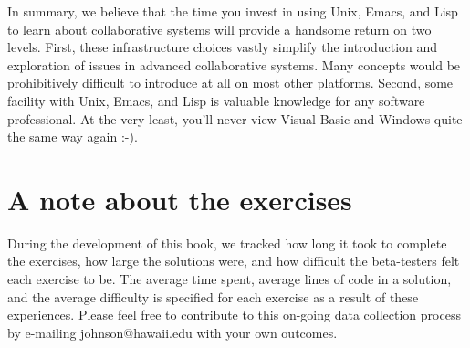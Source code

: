 In summary, we believe that the time you invest in using Unix, Emacs, and
Lisp to learn about collaborative systems will provide a handsome return on
two levels.  First, these infrastructure choices vastly simplify the
introduction and exploration of issues in advanced collaborative systems.
Many concepts would be prohibitively difficult to introduce at all on most
other platforms. Second, some facility with Unix, Emacs, and Lisp is
valuable knowledge for any software professional.  At the very least,
you'll never view Visual Basic and Windows quite the same way again :-).
 
\section{A note about the exercises}

During the development of this book, we tracked how long it took to
complete the exercises, how large the solutions were, and how difficult the
beta-testers felt each exercise to be.  The average time spent, average
lines of code in a solution, and the average difficulty is specified for
each exercise as a result of these experiences.  Please feel free to
contribute to this on-going data collection process by e-mailing
johnson@hawaii.edu with your own outcomes.






